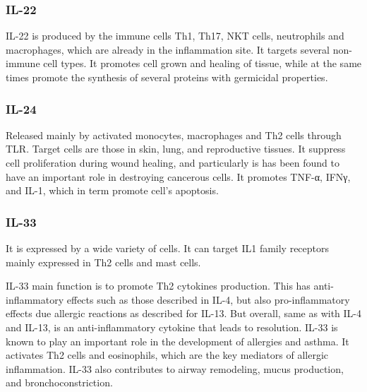

\subsubsection{IL-22}
\label{in:IL22}

IL-22 is produced by the immune cells Th1, Th17, NKT cells, neutrophils and macrophages, which are already in the inflammation site. It targets several non-immune cell types. It promotes cell grown and healing of tissue, while at the same times promote the synthesis of several proteins with germicidal properties.


\subsubsection{IL-24}
\label{in:IL24}

Released mainly by activated monocytes, macrophages and Th2 cells through TLR. Target cells are those in skin, lung, and reproductive tissues. It suppress cell proliferation during wound healing, and particularly is has been found to have an important role in destroying cancerous cells. It promotes TNF-α, IFNγ, and IL-1, which in term promote cell's apoptosis.

\subsubsection{IL-33}
\label{in:IL33}

It is expressed by a wide variety of cells. It can target IL1 family receptors mainly expressed in Th2 cells and mast cells.

IL-33 main function is to promote Th2 cytokines production. This has anti-inflammatory effects such as those described in IL-4, but also pro-inflammatory effects due allergic reactions as described for IL-13. But overall, same as with IL-4 and IL-13, is an anti-inflammatory cytokine that leads to resolution. IL-33 is known to play an important role in the development of allergies and asthma. It activates Th2 cells and eosinophils, which are the key mediators of allergic inflammation. IL-33 also contributes to airway remodeling, mucus production, and bronchoconstriction.

